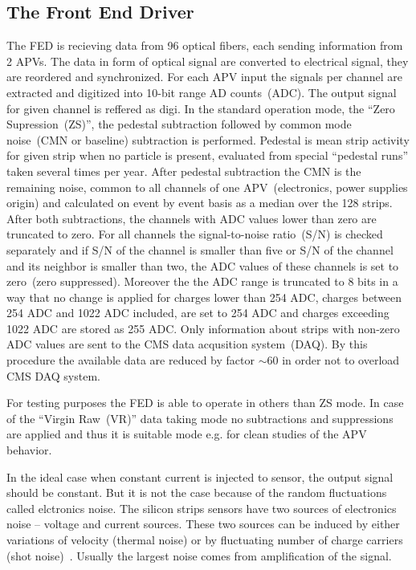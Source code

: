 
\subsection{The Front End Driver}


The FED is recieving data from 96 optical fibers, each sending information from 2 APVs. The data in form of optical signal are converted to electrical signal, they are reordered and synchronized. For each APV input the signals per channel are extracted and digitized into 10-bit range AD counts~(ADC). The output signal for given channel is reffered as digi. In the standard operation mode, the ``Zero Supression~(ZS)'', the pedestal subtraction followed by common mode noise~(CMN or baseline) subtraction is performed. Pedestal is mean strip activity for given strip when no particle is present, evaluated from special ``pedestal runs'' taken several times per year. After pedestal subtraction the CMN is the remaining noise, common to all channels of one APV~(electronics, power supplies origin) and calculated on event by event basis as a median over the 128 strips. After both subtractions, the channels with ADC values lower than zero are truncated to zero. For all channels the signal-to-noise ratio~(S/N) is checked separately and if S/N of the channel is smaller than five or S/N of the channel and its neighbor is smaller than two, the ADC values of these channels is set to zero~(zero suppressed). Moreover the the ADC range is truncated to 8 bits in a way that no change is applied for charges lower than 254 ADC, charges between 254 ADC and 1022 ADC included, are set to 254 ADC and charges exceeding 1022 ADC are stored as 255 ADC. Only information about strips with non-zero ADC values are sent to the CMS data acqusition system~(DAQ). By this procedure the available data are reduced by factor $\sim$60 in order not to overload CMS DAQ system.

For testing purposes the FED is able to operate in others than ZS mode. In case of the ``Virgin Raw~(VR)'' data taking mode no subtractions and suppressions are applied and thus it is suitable mode e.g. for clean studies of the APV behavior.

In the ideal case when constant current is injected to sensor, the output signal should be constant. But it is not the case because of the random fluctuations called elctronics noise. The silicon strips sensors have two sources of electronics noise -- voltage and current sources. These two sources can be induced by either variations of velocity (thermal noise) or by fluctuating number of charge carriers (shot noise)~\cite{website:noise}. Usually the largest noise comes from amplification of the signal. 

